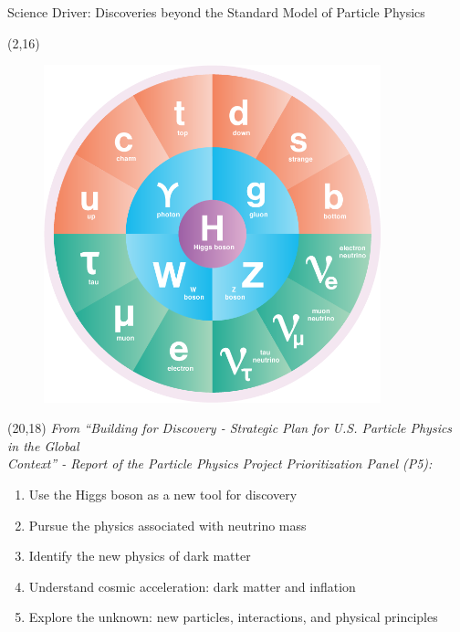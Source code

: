 \documentclass[final]{beamer}
\begin{document}
\begin{frame}{}
\begin{textblock}{80.0}
\begin{block}{Science Driver: Discoveries beyond the Standard Model of Particle Physics}
\begin{textblock}{16.0}(2,16)
\begin{figure}[H]
\includegraphics[width=0.87\textwidth]{images/standard_model_ai.png}
\end{figure}
\end{textblock}

\begin{textblock}{50.0}(20,18)
{\it From ``Building for Discovery - Strategic Plan for U.S. Particle Physics in the Global \\
Context'' - Report of the Particle Physics Project Prioritization Panel (P5):}

\begin{center}
\begin{enumerate}
\item Use the Higgs boson as a new tool for discovery
\item Pursue the physics associated with neutrino mass
\item Identify the new physics of dark matter
\item Understand cosmic acceleration: dark matter and inflation
\item Explore the unknown: new particles, interactions, and physical principles
\end{enumerate}
\end{center}
\end{textblock}


\end{block}
\end{textblock}
\end{frame}
\end{document}

